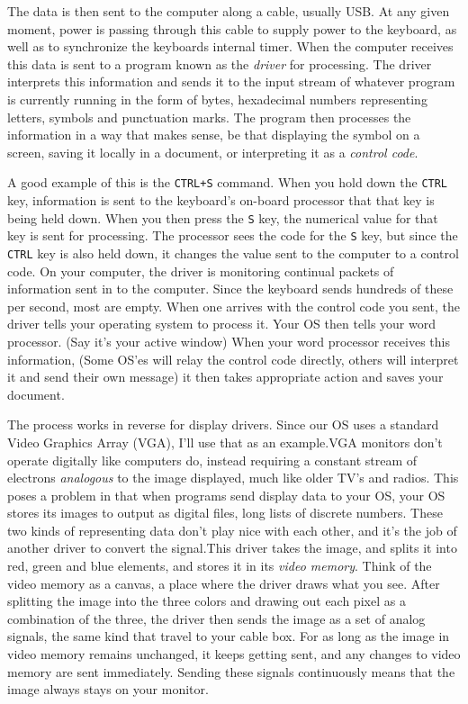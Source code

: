 \documentclass[english]{paper}
\begin{document}
The data is then sent to the computer along a cable, usually USB. At any given moment, power
is passing through this cable to supply power to the keyboard, as well as to synchronize the keyboards internal timer. When the
computer receives this data is sent to a program known as the {\it driver} for processing. The driver interprets this information
and sends it to the input stream of whatever program is currently running in the form of bytes, hexadecimal numbers representing
letters, symbols and punctuation marks. The program then processes the information in a way that makes sense, be that displaying
the symbol on a screen, saving it locally in a document, or interpreting it as a {\it control code}.

A good example of this is the \texttt{CTRL+S} command. When you hold down the \texttt{CTRL} key, information is sent to the keyboard's on-board processor that that key is being held down. When you then press the \texttt{S} key, the numerical value for that key is sent for processing. The processor sees the code for the \texttt{S} key, but since the \texttt{CTRL} key is also held down, it changes the value sent to the computer to a control code. On your computer, the driver is monitoring continual packets of information sent in to the computer. Since the keyboard sends hundreds of these per second, most are empty. When one arrives with the control code you sent, the driver tells your operating system to process it. Your OS then tells your word processor. (Say it's your active window) When your word processor receives this information, (Some OS'es will relay the control code directly, others will interpret it and send their own message) it then takes appropriate action and saves your document.

The process works in reverse for display drivers. Since our OS uses a standard Video Graphics Array (VGA), I'll use that as an example.VGA monitors don't operate digitally like computers do, instead requiring a constant stream of electrons {\it analogous} to the image displayed, much like older TV's and radios. This poses a problem in that when programs send display data to your OS, your OS stores its images to output as digital files, long lists of discrete numbers. These two kinds of representing data don't play nice with each other, and it's the job of another driver to convert the signal.This driver takes the image, and splits it into red, green and blue elements, and stores it in its {\it video memory}. Think of the video memory as a canvas, a place where the driver draws what you see. After splitting the image into the three colors and drawing out each pixel as a combination of the three, the driver then sends the image as a set of analog signals, the same kind that travel to your cable box. For as long as the image in video memory remains unchanged, it keeps getting sent, and any changes to video memory are sent immediately. Sending these signals continuously means that the image always stays on your monitor.
\end{document}
